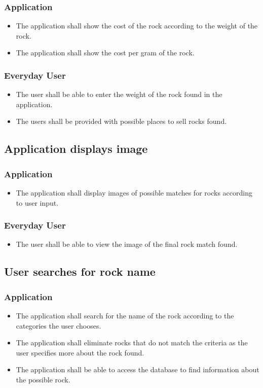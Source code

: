 \documentclass[titlepage]{article}
\begin{document}
\subsubsection{Application}
\begin{itemize}

  \item The application shall show the cost of the rock according to the weight of the rock. 
  \item The application shall show the cost per gram of the rock.
  \end{itemize}
  \subsubsection{Everyday User}
  \begin{itemize}
  \item The user shall be able to enter the weight of the rock found in the application.
  \item The users shall be provided with possible places to sell rocks found.
  
\end{itemize}

\subsection{Application displays image}
\subsubsection{Application}
\begin{itemize}
\item The application shall display images of possible matches for rocks according to user input.
\end{itemize}
  \subsubsection{Everyday User}
  \begin{itemize}
  \item The user shall be able to view the image of the final rock match found.
\end{itemize}


\subsection{User searches for rock name}
\subsubsection{Application}
\begin{itemize}

  \item The application shall search for the name of the rock according to the categories the user chooses.
  \item The application shall eliminate rocks that do not match the criteria as the user specifies more about the rock found. 
  \item The application shall be able to access the database to find information about the possible rock. 
  \end{itemize}
\end{document}
